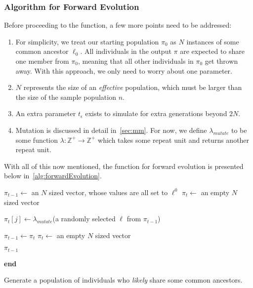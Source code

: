 \subsubsection{Algorithm for Forward Evolution}
Before proceeding to the function, a few more points need to be addressed:
\begin{enumerate}
    \item For simplicity, we treat our starting population $\pi_0$ as $N$ instances of some common ancestor $\ell_0$.
        All individuals in the output $\pi$ are expected to share one member from $\pi_0$, meaning that all other
        individuals in $\pi_0$ get thrown away.
        With this approach, we only need to worry about one parameter.
    \item $N$ represents the size of an \emph{effective} population, which must be larger than the size of the sample
        population $n$.
    \item An extra parameter $t_\epsilon$ exists to simulate for extra generations beyond $2N$.
    \item Mutation is discussed in detail in~\autoref{sec:mm}.
        For now, we define $\lambda_{mutate}$ to be some function $\lambda : \mathbb{Z}^+ \rightarrow \mathbb{Z}^+$ which
        takes some repeat unit and returns another repeat unit.
\end{enumerate}
With all of this now mentioned, the function for forward evolution is presented below in~\autoref{alg:forwardEvolution}.

\begin{algorithm}[ht]
    \SetAlgoLined
    \DontPrintSemicolon
     {
        $\pi_{t-1} \gets $ an $N$ sized vector, whose values are all set to $\ell^0$ \;
        $\pi_t \gets $ an empty $N$ sized vector \;
         {
             {
                $\pi_t[j] \gets \lambda_{mutate}$(a randomly selected $\ell$ from $\pi_{t-1}$) \;

            }
            $\pi_{t-1} \gets \pi_t$ \;
            $\pi_t \gets$ an empty $N$ sized vector \;
        }
        \Return $\pi_{t-1}$ \;
    }
    \textbf{end} \;
    \caption{Generate a population of individuals who \emph{likely} share some common ancestors.}
    \label{alg:forwardEvolution}
\end{algorithm}

